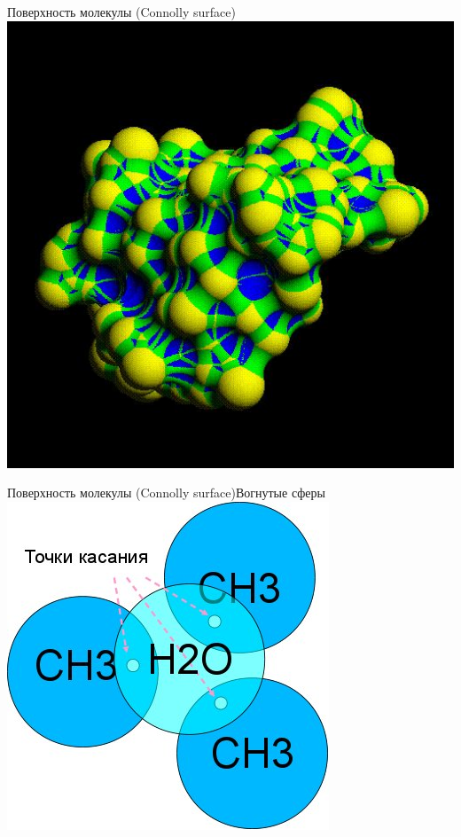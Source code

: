 \documentclass{beamer}
\begin{document}
    \begin{frame}{Поверхность молекулы (Connolly surface)}
        \includegraphics[height=0.9\textheight]{connolly-types.jpg}
    \end{frame}

    \begin{frame}{Поверхность молекулы (Connolly surface)}{Вогнутые сферы}
        \includegraphics[height=0.7\textheight]{connolly-3-points.jpg}
    \end{frame}
\end{document}
